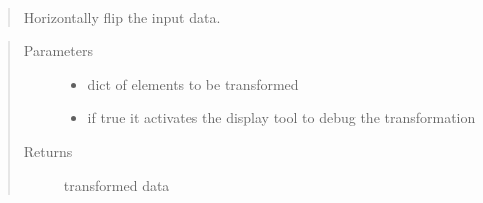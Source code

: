 \documentclass[letterpaper,10pt,english]{sphinxmanual}
\begin{document}
\begin{fulllineitems}
\label{\detokenize{ida_lib.operations:ida_lib.operations.transforms.hflip}}~\begin{quote}

Horizontally flip the input data.
\end{quote}
\begin{quote}\begin{description}
\item[{Parameters}] \leavevmode\begin{itemize}
\item {} 
 \textendash{} dict of elements to be transformed

\item {} 
 \textendash{} if true it activates the display tool to debug the transformation

\end{itemize}

\item[{Returns}] \leavevmode
transformed data

\end{description}\end{quote}

\end{fulllineitems}

\end{document}
